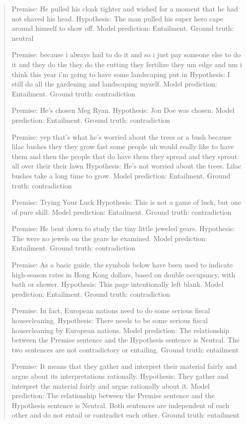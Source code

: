 \begin{quote}
Premise:
He pulled his cloak tighter and wished for a moment that he had not shaved his head.
Hypothesis:
The man pulled his super hero cape around himself to show off.
Model prediction: Entailment.
Ground truth: neutral


Premise:
because i always had to do it and so i just pay someone else to do it and they do the they do the cutting they fertilize they um edge and um i think this year i'm going to have some landscaping put in
Hypothesis:
I still do all the gardening and landscaping myself. 
Model prediction: Entailment.
Ground truth: contradiction


Premise:
He's chosen Meg Ryan.
Hypothesis:
Jon Doe was chosen.
Model prediction: Entailment.
Ground truth: contradiction


Premise:
yep that's what he's worried about the trees or a bush because lilac bushes they they grow fast some people uh would really like to have them and then the people that do have them they spread and they sprout all over their their lawn
Hypothesis:
He's not worried about the trees. Lilac bushes take a long time to grow.
Model prediction: Entailment.
Ground truth: contradiction


Premise:
Trying Your Luck
Hypothesis:
This is not a game of luck, but one of pure skill.
Model prediction: Entailment.
Ground truth: contradiction


Premise:
He bent down to study the tiny little jeweled gears.
Hypothesis:
The were no jewels on the gears he examined.
Model prediction: Entailment.
Ground truth: contradiction


Premise:
As a basic guide, the symbols below have been used to indicate high-season rates in Hong Kong dollars, based on double occupancy, with bath or shower.
Hypothesis:
This page intentionally left blank.
Model prediction: Entailment.
Ground truth: contradiction


Premise:
In fact, European nations need to do some serious fiscal housecleaning.
Hypothesis:
There needs to be some serious fiscal housecleaning by European nations.
Model prediction: The relationship between the Premise sentence and the Hypothesis sentence is Neutral. The two sentences are not contradictory or entailing.
Ground truth: entailment


Premise:
It means that they gather and interpret their material fairly and argue about its interpretations rationally.
Hypothesis:
They gather and interpret the material fairly and argue rationally about it.
Model prediction: The relationship between the Premise sentence and the Hypothesis sentence is Neutral. Both sentences are independent of each other and do not entail or contradict each other.
Ground truth: entailment



\end{quote}
